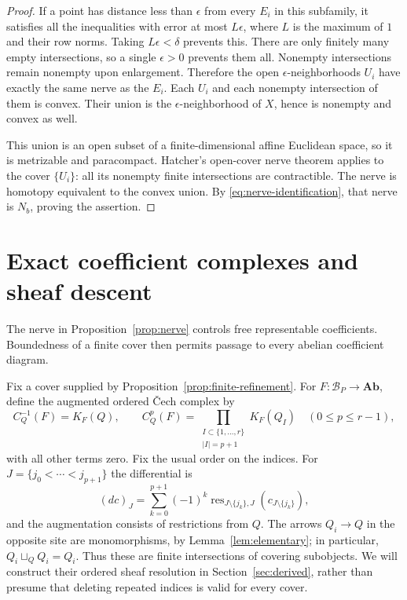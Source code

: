 \documentclass[11pt]{article}
\theoremstyle{definition}
\theoremstyle{remark}
\newcommand{\Ab}{\mathbf{Ab}}
\newcommand{\cB}{\mathcal B}
\begin{document}
\begin{proof}
If a point has distance less than $\epsilon$ from every $E_i$ in this subfamily, it satisfies all the inequalities with error at most $L\epsilon$, where $L$ is the maximum of $1$ and their row norms. Taking $L\epsilon<\delta$ prevents this. There are only finitely many empty intersections, so a single $\epsilon>0$ prevents them all. Nonempty intersections remain nonempty upon enlargement. Therefore the open $\epsilon$-neighborhoods $U_i$ have exactly the same nerve as the $E_i$. Each $U_i$ and each nonempty intersection of them is convex. Their union is the $\epsilon$-neighborhood of $X$, hence is nonempty and convex as well.

This union is an open subset of a finite-dimensional affine Euclidean space, so it is metrizable and paracompact. Hatcher's open-cover nerve theorem \cite[Corollary 4G.3, p.~459]{hatcher} applies to the cover $\{U_i\}$: all its nonempty finite intersections are contractible. The nerve is homotopy equivalent to the convex union. By \eqref{eq:nerve-identification}, that nerve is $N_b$, proving the assertion.
\end{proof}

\section{Exact coefficient complexes and sheaf descent}

The nerve in Proposition~\ref{prop:nerve} controls free representable coefficients. Boundedness of a finite cover then permits passage to every abelian coefficient diagram.

Fix a cover supplied by Proposition~\ref{prop:finite-refinement}. For $F:\cB_P\to\Ab$, define the augmented ordered \v{C}ech complex by
\begin{equation}\label{eq:ordered-cech}
 C_Q^{-1}(F)=K_F(Q),\qquad
 C_Q^p(F)=\prod_{\substack{I\subset\{1,\ldots,r\}\\|I|=p+1}}K_F(Q_I)
 \quad(0\leq p\leq r-1),
\end{equation}
with all other terms zero. Fix the usual order on the indices. For $J=\{j_0<\cdots<j_{p+1}\}$ the differential is
\[
 (dc)_J=\sum_{k=0}^{p+1}(-1)^k
 \operatorname{res}_{J\setminus\{j_k\},J}(c_{J\setminus\{j_k\}}),
\]
and the augmentation consists of restrictions from $Q$. The arrows $Q_i\to Q$ in the opposite site are monomorphisms, by Lemma~\ref{lem:elementary}; in particular, $Q_i\sqcup_Q Q_i=Q_i$. Thus these are finite intersections of covering subobjects. We will construct their ordered sheaf resolution in Section~\ref{sec:derived}, rather than presume that deleting repeated indices is valid for every cover.
\end{document}
